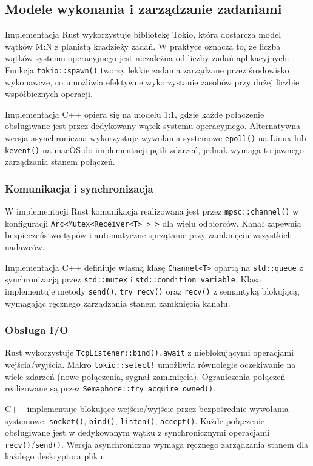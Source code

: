 \subsection{Modele wykonania i zarządzanie zadaniami}

Implementacja Rust wykorzystuje bibliotekę Tokio, która dostarcza model wątków M:N z planistą kradzieży zadań. W praktyce oznacza to, że liczba wątków systemu operacyjnego jest niezależna od liczby zadań aplikacyjnych. Funkcja \texttt{tokio::spawn()} tworzy lekkie zadania zarządzane przez środowisko wykonawcze, co umożliwia efektywne wykorzystanie zasobów przy dużej liczbie współbieżnych operacji.

Implementacja C++ opiera się na modelu 1:1, gdzie każde połączenie obsługiwane jest przez dedykowany wątek systemu operacyjnego. Alternatywna wersja asynchroniczna wykorzystuje wywołania systemowe \texttt{epoll()} na Linux lub \texttt{kevent()} na macOS do implementacji pętli zdarzeń, jednak wymaga to jawnego zarządzania stanem połączeń.

\subsubsection{Komunikacja i synchronizacja}

W implementacji Rust komunikacja realizowana jest przez \texttt{mpsc::channel()} w konfiguracji \texttt{Arc<Mutex<Receiver<T> > >} dla wielu odbiorców. Kanał zapewnia bezpieczeństwo typów i automatyczne sprzątanie przy zamknięciu wszystkich nadawców.

Implementacja C++ definiuje własną klasę \texttt{Channel<T>} opartą na \texttt{std::queue} z synchronizacją przez \texttt{std::mutex} i \texttt{std::condition\_variable}. Klasa implementuje metody \texttt{send()}, \texttt{try\_recv()} oraz \texttt{recv()} z semantyką blokującą, wymagając ręcznego zarządzania stanem zamknięcia kanału.

\subsubsection{Obsługa I/O}

Rust wykorzystuje \texttt{TcpListener::bind().await} z nieblokującymi operacjami \mbox{wejścia/wyjścia}. Makro \texttt{tokio::select!} umożliwia równoległe oczekiwanie na wiele zdarzeń (nowe połączenia, sygnał zamknięcia). Ograniczenia połączeń realizowane są przez \texttt{Semaphore::try\_acquire\_owned()}.

C++ implementuje blokujące wejście/wyjście przez bezpośrednie wywołania systemowe: \texttt{socket()}, \texttt{bind()}, \texttt{listen()}, \texttt{accept()}. Każde połączenie obsługiwane jest w dedykowanym wątku z synchronicznymi operacjami \texttt{recv()}/\texttt{send()}. Wersja asynchroniczna wymaga ręcznego zarządzania stanem dla każdego deskryptora pliku.

